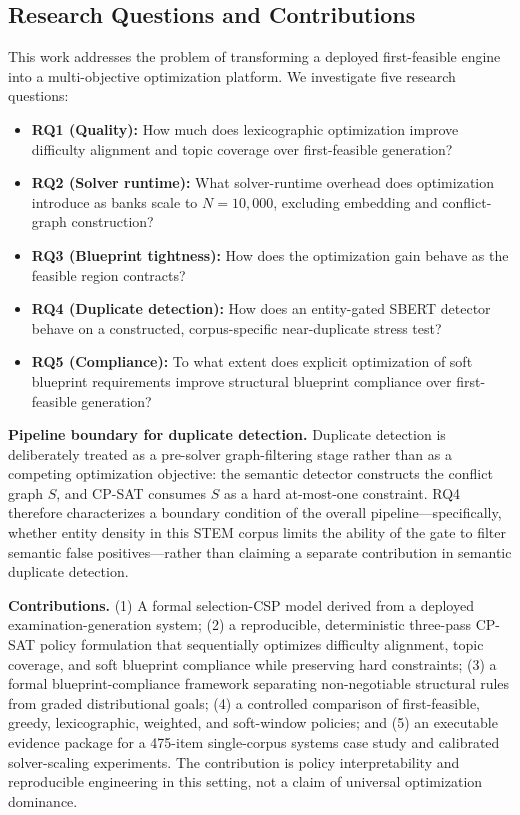 \documentclass[runningheads]{llncs}
\begin{document}
\subsection{Research Questions and Contributions}
This work addresses the problem of transforming a deployed first-feasible engine into a multi-objective optimization platform.
We investigate five research questions:
\begin{itemize}
    \item \textbf{RQ1 (Quality):} How much does lexicographic optimization improve difficulty alignment and topic coverage over first-feasible generation?
    \item \textbf{RQ2 (Solver runtime):} What solver-runtime overhead does optimization introduce as banks scale to $N=10{,}000$, excluding embedding and conflict-graph construction?
    \item \textbf{RQ3 (Blueprint tightness):} How does the optimization gain behave as the feasible region contracts?
    \item \textbf{RQ4 (Duplicate detection):} How does an entity-gated SBERT detector behave on a constructed, corpus-specific near-duplicate stress test?
    \item \textbf{RQ5 (Compliance):} To what extent does explicit optimization of soft blueprint requirements improve structural blueprint compliance over first-feasible generation?
\end{itemize}

\noindent\textbf{Pipeline boundary for duplicate detection.} Duplicate detection is deliberately treated as a pre-solver graph-filtering stage rather than as a competing optimization objective: the semantic detector constructs the conflict graph $S$, and CP-SAT consumes $S$ as a hard at-most-one constraint.
RQ4 therefore characterizes a boundary condition of the overall pipeline---specifically, whether entity density in this STEM corpus limits the ability of the gate to filter semantic false positives---rather than claiming a separate contribution in semantic duplicate detection.

\noindent\textbf{Contributions.} (1) A formal selection-CSP model derived from a deployed examination-generation system;
(2) a reproducible, deterministic three-pass CP-SAT policy formulation that sequentially optimizes difficulty alignment, topic coverage, and soft blueprint compliance while preserving hard constraints;
(3) a formal blueprint-compliance framework separating non-negotiable structural rules from graded distributional goals;
(4) a controlled comparison of first-feasible, greedy, lexicographic, weighted, and soft-window policies;
and (5) an executable evidence package for a 475-item single-corpus systems case study and calibrated solver-scaling experiments.
The contribution is policy interpretability and reproducible engineering in this setting, not a claim of universal optimization dominance.
\end{document}

